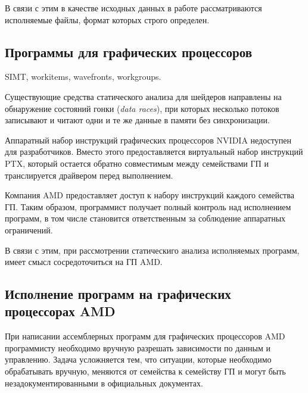 \documentclass[a4paper,14pt]{extarticle}
\begin{document}
В связи с этим в качестве исходных данных в работе рассматриваются исполняемые файлы,
формат которых строго определен.

\subsection{Программы для графических процессоров}

SIMT, workitems, wavefronts, workgroups.

Существующие средства статического анализа для шейдеров направлены на обнаружение
состояний гонки (\textit{data races}), при которых несколько потоков записывают
и читают одни и те же данные в памяти без синхронизации.

Аппаратный набор инструкций графических процессоров NVIDIA недоступен для разработчиков.
Вместо этого предоставляется виртуальный набор инструкций PTX, который остается
обратно совместимым между семействами ГП и транслируется драйвером перед выполнением.

Компания AMD предоставляет доступ к набору инструкций каждого семейства ГП. Таким образом,
программист получает полный контроль над исполнением программ, в том числе становится
ответственным за соблюдение аппаратных ограничений.

В связи с этим, при рассмотрении статическиго анализа исполняемых программ, имеет
смысл сосредоточиться на ГП AMD.

\subsection{Исполнение программ на графических процессорах AMD}

При написании ассемблерных программ для графических процессоров AMD программисту
необходимо вручную разрешать зависимости по данным и управлению. Задача усложняется
тем, что ситуации, которые необходимо обрабатывать вручную, меняются от семейства к семейству ГП
и могут быть незадокументированными в официальных документах.
\end{document}
